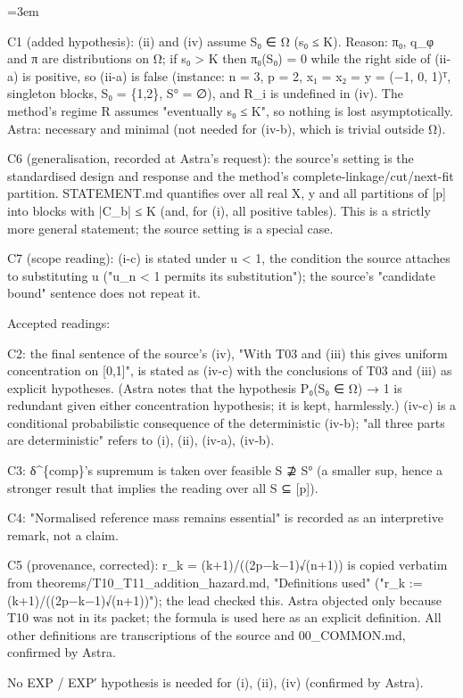 \documentclass[11pt]{report}
\newenvironment{mdblock}{\begingroup\mdfont\raggedright\setlength{\parindent}{0pt}\setlength{\parskip}{0.55em}\emergencystretch=3em}{\par\endgroup}
\begin{document}
\begin{mdblock}
\begin{mdbul}
\item C1 (added hypothesis): (ii) and (iv) assume S₀ ∈ Ω (s₀ ≤ K). Reason: π₀, q\_φ and π are distributions on Ω; if s₀ > K then π₀(S₀) = 0 while the right side of (ii-a) is positive, so (ii-a) is false (instance: n = 3, p = 2, x₁ = x₂ = y = (−1, 0, 1)ᵀ, singleton blocks, S₀ = \{1,2\}, S° = ∅), and R\_i is undefined in (iv). The method's regime R assumes "eventually s₀ ≤ K", so nothing is lost asymptotically. Astra: necessary and minimal (not needed for (iv-b), which is trivial outside Ω).
\item C6 (generalisation, recorded at Astra's request): the source's setting is the standardised design and response and the method's complete-linkage/cut/next-fit partition. STATEMENT.md quantifies over all real X, y and all partitions of [p] into blocks with |C\_b| ≤ K (and, for (i), all positive tables). This is a strictly more general statement; the source setting is a special case.
\item C7 (scope reading): (i-c) is stated under u < 1, the condition the source attaches to substituting u ("u\_n < 1 permits its substitution"); the source's "candidate bound" sentence does not repeat it.
\end{mdbul}

Accepted readings:

\begin{mdbul}
\item C2: the final sentence of the source's (iv), "With T03 and (iii) this gives uniform concentration on [0,1]", is stated as (iv-c) with the conclusions of T03 and (iii) as explicit hypotheses. (Astra notes that the hypothesis P₀(S₀ ∈ Ω) → 1 is redundant given either concentration hypothesis; it is kept, harmlessly.) (iv-c) is a conditional probabilistic consequence of the deterministic (iv-b); "all three parts are deterministic" refers to (i), (ii), (iv-a), (iv-b).
\item C3: δ\textasciicircum{}\{comp\}'s supremum is taken over feasible S ⊉ S° (a smaller sup, hence a stronger result that implies the reading over all S ⊆ [p]).
\item C4: "Normalised reference mass remains essential" is recorded as an interpretive remark, not a claim.
\item C5 (provenance, corrected): r\_k = (k+1)/((2p−k−1)√(n+1)) is copied verbatim from {\mdtt theorems/\allowbreak{}T10\_\allowbreak{}T11\_\allowbreak{}addition\_\allowbreak{}hazard.\allowbreak{}md}, "Definitions used" ("r\_k := (k+1)/((2p−k−1)√(n+1))"); the lead checked this. Astra objected only because T10 was not in its packet; the formula is used here as an explicit definition. All other definitions are transcriptions of the source and 00\_COMMON.md, confirmed by Astra.
\item No EXP / EXP′ hypothesis is needed for (i), (ii), (iv) (confirmed by Astra).
\end{mdbul}
\end{mdblock}
\end{document}
